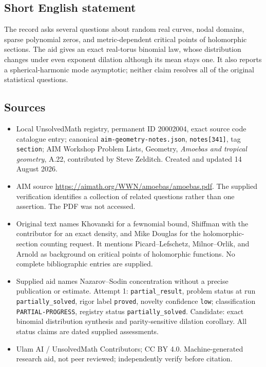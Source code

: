 \documentclass[11pt]{article}
\begin{document}
\subsection{Short English statement}
The record asks several questions about random real curves, nodal domains, sparse polynomial zeros, and metric-dependent critical points of holomorphic sections. The aid gives an exact real-torus binomial law, whose distribution changes under even exponent dilation although its mean stays one. It also reports a spherical-harmonic mode asymptotic; neither claim resolves all of the original statistical questions.
\subsection{Sources}
\begin{itemize}
\item Local UnsolvedMath registry, permanent ID 20002004, exact source code catalogue entry; canonical \texttt{aim-geometry-notes.json}, \texttt{notes[341]}, tag \texttt{section}; AIM Workshop Problem Lists, Geometry, \emph{Amoebas and tropical geometry}, A.22, contributed by Steve Zelditch. Created and updated 14 August 2026.
\item AIM source \url{https://aimath.org/WWN/amoebas/amoebas.pdf}. The supplied verification identifies a collection of related questions rather than one assertion. The PDF was not accessed.
\item Original text names Khovanski for a fewnomial bound, Shiffman with the contributor for an exact density, and Mike Douglas for the holomorphic-section counting request. It mentions Picard--Lefschetz, Milnor--Orlik, and Arnold as background on critical points of holomorphic functions. No complete bibliographic entries are supplied.
\item Supplied aid names Nazarov--Sodin concentration without a precise publication or estimate. Attempt 1: \texttt{partial\_result}, problem status at run \texttt{partially\_solved}, rigor label \texttt{proved}, novelty confidence \texttt{low}; classification \texttt{PARTIAL-PROGRESS}, registry status \texttt{partially\_solved}. Candidate: exact binomial distribution synthesis and parity-sensitive dilation corollary. All status claims are dated supplied assessments.
\item Ulam AI / UnsolvedMath Contributors; CC BY 4.0. Machine-generated research aid, not peer reviewed; independently verify before citation.
\end{itemize}
\end{document}
